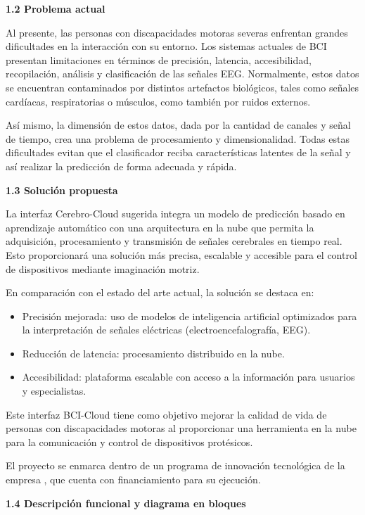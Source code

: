 \documentclass[
11pt, %
]{charter}
\begin{document}
\textbf{1.2 Problema actual}

Al presente, las personas con discapacidades motoras severas enfrentan grandes dificultades en la interacción con su entorno. Los sistemas actuales de BCI presentan limitaciones en términos de precisión, latencia, accesibilidad, recopilación,
análisis y clasificación de las señales EEG. Normalmente, estos datos se encuentran contaminados por distintos artefactos biológicos, tales como señales cardíacas, respiratorias o músculos, como también por ruidos externos.

Así mismo, la dimensión de estos datos, dada por la cantidad de canales y señal de tiempo, crea una problema de procesamiento y dimensionalidad. Todas estas dificultades evitan que el clasificador reciba características latentes de la señal y así realizar la predicción de forma adecuada y rápida.

\textbf{1.3 Solución propuesta}

La interfaz Cerebro-Cloud sugerida integra un modelo de predicción basado en aprendizaje automático con una arquitectura en la nube que permita la adquisición, procesamiento y transmisión de señales cerebrales en tiempo real. Esto proporcionará una solución más precisa, escalable y accesible para el control
de dispositivos mediante imaginación motriz.



En comparación con el estado del arte actual, la solución se destaca en:

\begin{itemize}
	\item Precisión mejorada: uso de modelos de inteligencia artificial optimizados para la interpretación de señales eléctricas (electroencefalografía, EEG).
	\item Reducción de latencia: procesamiento distribuido en la nube.
	\item Accesibilidad: plataforma escalable con acceso a la información para usuarios y especialistas.
\end{itemize}

Este interfaz BCI-Cloud tiene como objetivo mejorar la calidad de vida de personas con discapacidades motoras
al proporcionar una herramienta en la nube para la comunicación y control de dispositivos protésicos.

El proyecto se enmarca dentro de un programa de innovación tecnológica de la empresa \clientename, que cuenta con financiamiento para su ejecución.

\textbf{1.4 Descripción funcional y diagrama en bloques}
\end{document}
